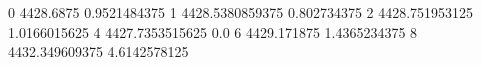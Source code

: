 0 4428.6875 0.9521484375
1 4428.5380859375 0.802734375
2 4428.751953125 1.0166015625
4 4427.7353515625 0.0
6 4429.171875 1.4365234375
8 4432.349609375 4.6142578125
